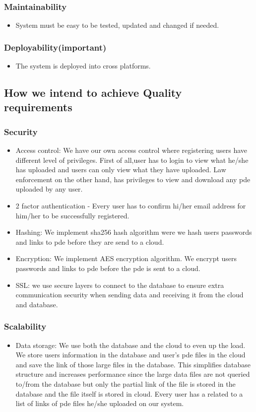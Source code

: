 \documentclass[a4paper,12pt]{article}
\begin{document}
	\subsubsection{Maintainability}
		\begin{itemize}
			\item System must be easy to be tested, updated and changed if needed.
		\end{itemize}
	\subsubsection{Deployability(important)}
		\begin{itemize}
			\item The system is deployed into cross platforms.
		\end{itemize}
\subsection{How we intend to achieve Quality requirements}
\subsubsection{Security}
	\begin{itemize}
		\item Access control: We have our own access control where registering users have different level of privileges. First of all,user has to login to view what he/she has uploaded and users can only view what they have uploaded. Law enforcement on the other hand, has privileges to view and download any pde uploaded by any user.
		\item 2 factor authentication - Every user has to confirm hi/her email address for him/her to be successfully registered.
		\item Hashing: We implement sha256 hash algorithm were we hash users passwords and links to pde before they are send to a cloud. 
		\item Encryption: We implement AES encryption algorithm. We encrypt users passwords and links to pde before the pde is sent to a cloud. 
		\item SSL: we use secure layers to connect to the database to ensure extra communication security when sending data and receiving it from the cloud and database.
	\end{itemize}
\subsubsection{Scalability}
	\begin{itemize}
		\item Data storage: We use both the database and the cloud to even up the load. We store users information in the database and user's pde files in the cloud and save the link of those large files in the database. This simplifies database structure and increases performance since the large data files are not queried to/from the database but only the partial link of the file is stored in the database and the file itself is stored in cloud. Every user has a related to a list of links of pde files he/she uploaded on our system. 
	\end{itemize}
\end{document}
